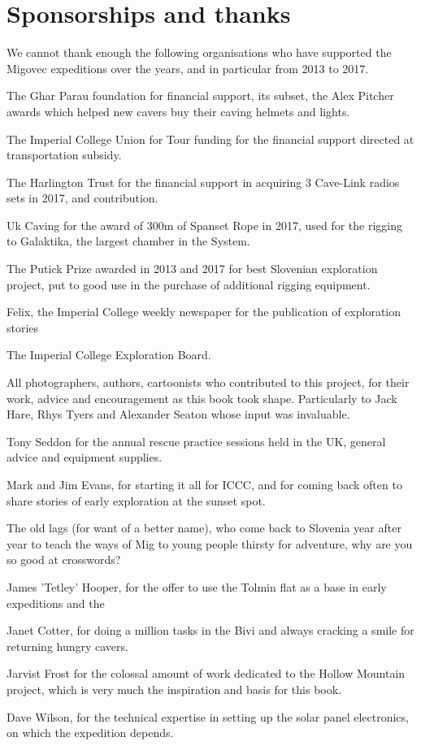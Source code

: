 \section{Sponsorships and thanks}
We cannot thank enough the following organisations who have supported the Migovec expeditions over the years, and in particular from 2013 to 2017.
\begin{citemize}
\item The Ghar Parau foundation for financial support, its subset, the Alex Pitcher awards which helped new cavers buy their caving helmets and lights.
\item The Imperial College Union for Tour funding for the financial support directed at transportation subsidy.
\item The Harlington Trust for the financial support in acquiring 3 Cave-Link radios sets in 2017, and contribution.
\item Uk Caving for the award of 300m of Spanset Rope in 2017, used for the rigging to Galaktika, the largest chamber in the System.
\item The Putick Prize awarded in 2013 and 2017 for best Slovenian exploration project, put to good use in the purchase of additional rigging equipment.
\item Felix, the Imperial College weekly newspaper for the publication of exploration stories
\item The Imperial College Exploration Board. 


\item All photographers, authors, cartoonists who contributed to this project, for their work, advice and encouragement as this book took shape. Particularly to Jack Hare, Rhys Tyers and Alexander Seaton whose input was invaluable. 

\item Tony Seddon for the annual rescue practice sessions held in the UK, general advice and equipment supplies.

\item Mark and Jim Evans, for starting it all for ICCC, and for coming back often to share stories of early exploration at the sunset spot.
\item The old lags (for want of a better name), who come back to Slovenia year after year to teach the ways of Mig to young people thirsty for adventure, why are you so good at crosswords?
\item James 'Tetley' Hooper, for the offer to use the Tolmin flat as a base in early expeditions and the 
\item Janet Cotter, for doing a million tasks in the Bivi and always cracking a smile for returning hungry cavers. 
\item Jarvist Frost for the colossal amount of work dedicated to the Hollow Mountain project, which is very much the inspiration and basis for this book. 
\item Dave Wilson, for the technical expertise in setting up the solar panel electronics, on which the expedition depends.


\end{citemize}
